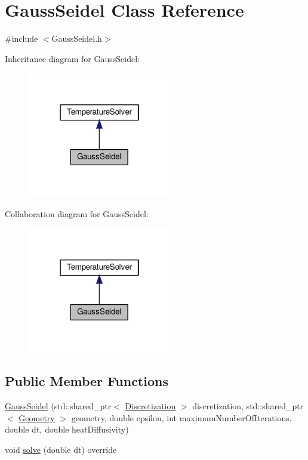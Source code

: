 \hypertarget{classGaussSeidel}{}\section{Gauss\+Seidel Class Reference}
\label{classGaussSeidel}


{\ttfamily \#include $<$Gauss\+Seidel.\+h$>$}



Inheritance diagram for Gauss\+Seidel\+:\nopagebreak
\begin{figure}[H]
\begin{center}
\leavevmode
\includegraphics[width=178pt]{classGaussSeidel__inherit__graph}
\end{center}
\end{figure}


Collaboration diagram for Gauss\+Seidel\+:\nopagebreak
\begin{figure}[H]
\begin{center}
\leavevmode
\includegraphics[width=178pt]{classGaussSeidel__coll__graph}
\end{center}
\end{figure}
\subsection*{Public Member Functions}
\begin{DoxyCompactItemize}
\item 
\mbox{\hyperlink{classGaussSeidel_a65c96c3cedc1a2d0a50ed0e2104ec290}{Gauss\+Seidel}} (std\+::shared\+\_\+ptr$<$ \mbox{\hyperlink{classDiscretization}{Discretization}} $>$ discretization, std\+::shared\+\_\+ptr$<$ \mbox{\hyperlink{classGeometry}{Geometry}} $>$ geometry, double epsilon, int maximum\+Number\+Of\+Iterations, double dt, double heat\+Diffusivity)
\item 
void \mbox{\hyperlink{classGaussSeidel_a171c7ffb638a311696c2c62b737d45d0}{solve}} (double dt) override
\end{DoxyCompactItemize}
